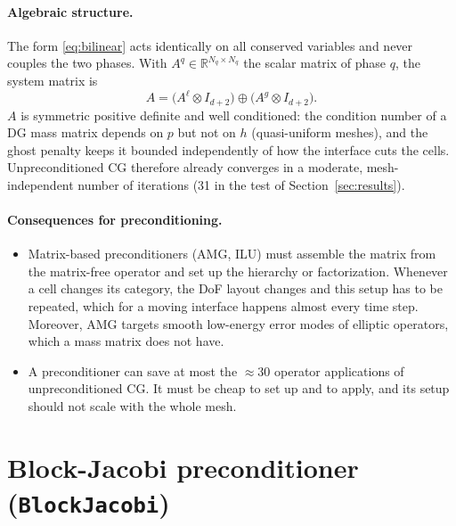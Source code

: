 \documentclass[11pt,a4paper]{article}
\newcommand{\param}[1]{\texttt{#1}}
\begin{document}
\paragraph{Algebraic structure.}
The form \eqref{eq:bilinear} acts identically on all conserved variables and never couples the two
phases. With $A^q\in\mathbb{R}^{N_q\times N_q}$ the scalar matrix of phase $q$, the system matrix
is
\begin{equation}
  A = \bigl(A^\ell\otimes I_{d+2}\bigr) \oplus \bigl(A^g\otimes I_{d+2}\bigr).
  \label{eq:kronecker}
\end{equation}
$A$ is symmetric positive definite and well conditioned: the condition number of a DG mass matrix
depends on $p$ but not on $h$ (quasi-uniform meshes), and the ghost penalty keeps it bounded
independently of how the interface cuts the cells. Unpreconditioned CG therefore already converges
in a moderate, mesh-independent number of iterations (31 in the test of Section~\ref{sec:results}).

\paragraph{Consequences for preconditioning.}
\begin{itemize}[leftmargin=*]
  \item Matrix-based preconditioners (AMG, ILU) must assemble the matrix from the matrix-free
        operator and set up the hierarchy or factorization. Whenever a cell changes its category,
        the DoF layout changes and this setup has to be repeated, which for a moving interface
        happens almost every time step. Moreover, AMG targets smooth low-energy error modes of
        elliptic operators, which a mass matrix does not have.
  \item A preconditioner can save at most the $\approx 30$ operator applications of
        unpreconditioned CG. It must be cheap to set up and to apply, and its setup should not
        scale with the whole mesh.
\end{itemize}

\section{Block-Jacobi preconditioner (\texorpdfstring{\param{BlockJacobi}}{BlockJacobi})}
\label{sec:bj}
\end{document}
